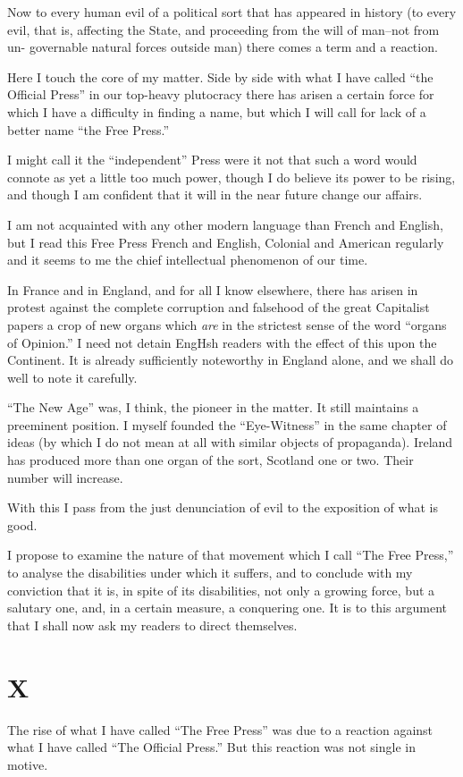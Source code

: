 \documentclass{book}
\begin{document}
Now to every human evil of a political sort that has appeared in history (to every evil, that is, affecting the State, and proceeding from the will of man–not from un- governable natural forces outside man) there comes a term and a reaction.

Here I touch the core of my matter. Side by side with what I have called “the Official Press” in our top-heavy plutocracy there has arisen a certain force for which I have a difficulty in finding a name, but which I will call for lack of a better name “the Free Press.”

I might call it the “independent” Press were it not that such a word would connote as yet a little too much power, though I do believe its power to be rising, and though I am confident that it will in the near future change our affairs.

I am not acquainted with any other modern language than French and English, but I read this Free Press French and English, Colonial and American regularly and it seems to me the chief intellectual phenomenon of our time.

In France and in England, and for all I know elsewhere, there has arisen in protest against the complete corruption and falsehood of the great Capitalist papers a crop of new organs which \emph{are} in the strictest sense of the word “organs of Opinion.” I need not detain EngHsh readers with the effect of this upon the Continent. It is already sufficiently noteworthy in England alone, and we shall do well to note it carefully.

“The New Age” was, I think, the pioneer in the matter. It still maintains a preeminent position. I myself founded the “Eye-Witness” in the same chapter of ideas (by which I do not mean at all with similar objects of propaganda). Ireland has produced more than one organ of the sort, Scotland one or two. Their number will increase.

With this I pass from the just denunciation of evil to the exposition of what is good.

I propose to examine the nature of that movement which I call “The Free Press,” to analyse the disabilities under which it suffers, and to conclude with my conviction that it is, in spite of its disabilities, not only a growing force, but a salutary one, and, in a certain measure, a conquering one. It is to this argument that I shall now ask my readers to direct themselves.

\chapter*{X}
\label{chapter-11}
The rise of what I have called “The Free Press” was due to a reaction against what I have called “The Official Press.” But this reaction was not single in motive.
\end{document}
